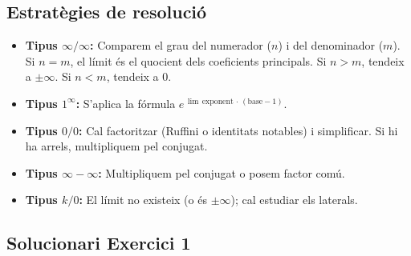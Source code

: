 \documentclass[12pt,a4paper]{article}
\begin{document}
\subsection*{Estratègies de resolució}
\begin{itemize}
    \item \textbf{Tipus $\infty/\infty$:} Comparem el grau del numerador ($n$) i del denominador ($m$). Si $n=m$, el límit és el quocient dels coeficients principals. Si $n>m$, tendeix a $\pm\infty$. Si $n<m$, tendeix a $0$.
    \item \textbf{Tipus $1^\infty$:} S'aplica la fórmula $\displaystyle e^{\,\lim\, \text{exponent}\,\cdot\,(\text{base}-1)}$.
    \item \textbf{Tipus $0/0$:} Cal factoritzar (Ruffini o identitats notables) i simplificar. Si hi ha arrels, multipliquem pel conjugat.
    \item \textbf{Tipus $\infty-\infty$:} Multipliquem pel conjugat o posem factor comú.
    \item \textbf{Tipus $k/0$:} El límit no existeix (o és $\pm\infty$); cal estudiar els laterals.
\end{itemize}

\subsection*{Solucionari Exercici 1}
\end{document}
